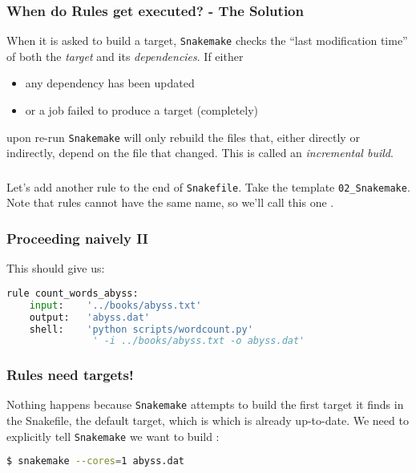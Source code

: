 \begin{frame}
  \frametitle{When do Rules get executed? - The Solution}
  When it is asked to build a target, \texttt{Snakemake} checks the “last modification time” of both the \emph{target} and its \emph{dependencies}.
  If either
  \begin{itemize}
   \item any dependency has been updated
   \item or a job failed to produce a target (completely)
  \end{itemize}
  upon re-run \texttt{Snakemake} will only rebuild the files that, either directly or indirectly, depend on the file that changed. This is called an \emph{incremental build}.
  \pause
\end{frame}

\begin{frame}[fragile]
  \frametitle{}
  Let’s add another rule to the end of \texttt{Snakefile}. Take the template \texttt{02\_Snakemake}. Note that rules cannot have the same name, so we’ll call this one .
\end{frame}

\begin{frame}[fragile]
   \frametitle{Proceeding naively II}
   This should give us:
  \begin{lstlisting}[language=Python,style=Python]
rule count_words_abyss:
    input:    '../books/abyss.txt'
    output:   'abyss.dat'
    shell:    'python scripts/wordcount.py' 
               ' -i ../books/abyss.txt -o abyss.dat'
  \end{lstlisting}
\end{frame}

\begin{frame}[fragile]
  \frametitle{Rules need targets!}
  Nothing happens because \texttt{Snakemake} attempts to build the first target it finds in the Snakefile, the default target, which is  which is already up-to-date. We need to explicitly tell \texttt{Snakemake} we want to build :
  \begin{lstlisting}[language=Bash, style=Shell]
$ snakemake --cores=1 abyss.dat
  \end{lstlisting}
\end{frame}

